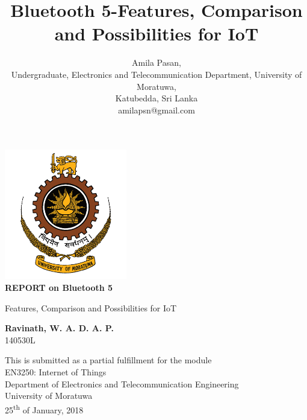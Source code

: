 \documentclass[journal, a4paper]{IEEEtran}
\begin{document}
\begin{titlepage}
    \begin{center}
        \vspace*{1cm}
        \includegraphics[width=0.4\textwidth]{logo.png}\\
        \textbf{REPORT on Bluetooth 5}
        
        \vspace{0.5cm}
        Features, Comparison and Possibilities for IoT
        
        \vspace{8cm}
        
        \textbf{Ravinath, W. A. D. A. P.}\\
        140530L
        
        \vfill
				\vfill
        
        This is submitted as a partial fulfillment for the module\\
        EN3250: Internet of Things\\
				Department of Electronics and Telecommunication Engineering\\
				University of Moratuwa\\
				25\textsuperscript{th} of January, 2018\\         
    \end{center}
\end{titlepage}


\title{Bluetooth 5-Features, Comparison and Possibilities for IoT}
	\author{Amila Pasan,\\
	Undergraduate, Electronics and Telecommunication Department, University of Moratuwa,\\
	Katubedda, Sri Lanka\\
	amilapsn@gmail.com}
\end{document}
